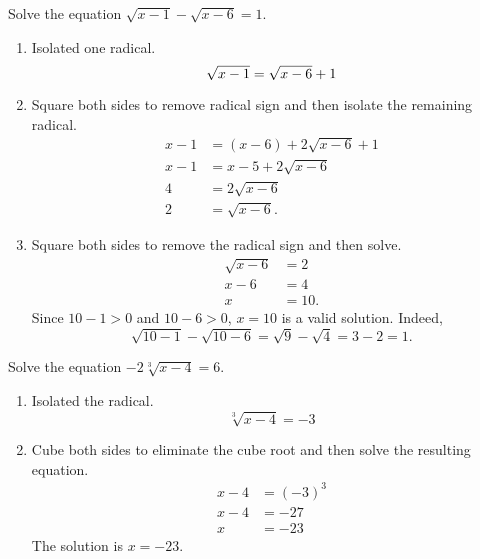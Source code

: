 
	\begin{example}
		Solve the equation $\sqrt{x-1}-\sqrt{x-6}=1.$
	\end{example}
	\begin{solution}
		\begin{multicols}{2}
			\begin{enumerate}[label={\textbf{\textup{Step \arabic*.}}~}]
				\item Isolated one radical.
				      \[
					      \sqrt{x-1}=\sqrt{x-6}+1\\
				      \]
				\item Square both sides to remove radical sign and then isolate the remaining radical.
				      \[
					      \begin{split}
						      x-1&=(x-6)+2\sqrt{x-6}+1\\
						      x-1&=x-5+2\sqrt{x-6}\\
						      4&=2\sqrt{x-6}\\
						      2&=\sqrt{x-6}.
					      \end{split}
				      \]
				\item Square both sides to remove the radical sign and then solve.
				      \[
					      \begin{split}
						      \sqrt{x-6}&=2\\
						      x-6&=4\\
						      x&=10.
					      \end{split}
				      \]
				      Since $10-1>0$ and $10-6>0$, $x=10$ is a valid solution. Indeed,
				      \[
					      \sqrt{10-1}-\sqrt{10-6}=\sqrt{9}-\sqrt{4}=3-2=1.
				      \]
			\end{enumerate}
		\end{multicols}
	\end{solution}



	\begin{example}
		Solve the equation $-2\sqrt[3]{x-4}=6.$
	\end{example}
	\begin{solution}
			\begin{enumerate}[label={\textbf{\textup{Step \arabic*.}}~}]
				\item Isolated the radical.
					  \[
						  \sqrt[3]{x-4}=-3
					  \]
				\item Cube both sides to eliminate the cube root and then solve the resulting equation.
				      \[
					      \begin{split}
						      x-4&=(-3)^3\\
						      x-4&=-27\\
						      x&=-23
					      \end{split}
				      \]
				      The solution is $x=-23$.
			\end{enumerate}
	\end{solution}


